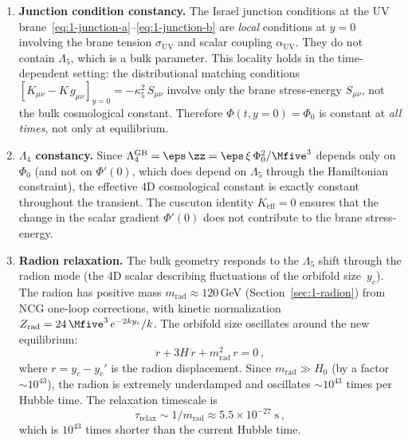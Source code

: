 \begin{enumerate}
\item \textbf{Junction condition constancy.} The Israel junction conditions at the UV brane~\eqref{eq:1-junction-a}--\eqref{eq:1-junction-b} are \emph{local} conditions at $y = 0$ involving the brane tension $\sigma_{\mathrm{UV}}$ and scalar coupling $\alpha_{\mathrm{UV}}$. They do not contain $\Lambda_5$, which is a bulk parameter. This locality holds in the time-dependent setting: the distributional matching conditions $[K_{\mu\nu} - K\, g_{\mu\nu}]_{y=0} = -\kappa_5^2\, S_{\mu\nu}$ involve only the brane stress-energy $S_{\mu\nu}$, not the bulk cosmological constant. Therefore $\Phi(t, y{=}0) = \Phi_0$ is constant at \emph{all times}, not only at equilibrium.

\item \textbf{$\Lambda_4$ constancy.} Since $\Lambda_4^{\mathrm{GB}} = \eps\,\zz = \eps\,\xi\,\Phi_0^2/\Mfive^3$ depends only on $\Phi_0$ (and not on $\Phi'(0)$, which does depend on $\Lambda_5$ through the Hamiltonian constraint), the effective 4D cosmological constant is exactly constant throughout the transient. The cuscuton identity $K_{\mathrm{eff}} = 0$ ensures that the change in the scalar gradient $\Phi'(0)$ does not contribute to the brane stress-energy.

\item \textbf{Radion relaxation.} The bulk geometry responds to the $\Lambda_5$ shift through the radion mode (the 4D scalar describing fluctuations of the orbifold size~$y_c$). The radion has positive mass $m_{\mathrm{rad}} \approx 120\,$GeV (Section~\ref{sec:1-radion}) from NCG one-loop corrections, with kinetic normalization $Z_{\mathrm{rad}} = 24\,\Mfive^3\,e^{-2ky_c}/k$. The orbifold size oscillates around the new equilibrium:
\begin{equation}
\ddot{r} + 3H\,\dot{r} + m_{\mathrm{rad}}^2\,r = 0\,,
\end{equation}
where $r = y_c - y_c'$ is the radion displacement. Since $m_{\mathrm{rad}} \gg H_0$ (by a factor $\sim 10^{43}$), the radion is extremely underdamped and oscillates $\sim 10^{43}$ times per Hubble time. The relaxation timescale is
\begin{equation}
\tau_{\mathrm{relax}} \sim 1/m_{\mathrm{rad}} \approx 5.5 \times 10^{-27}\;\mathrm{s}\,,
\end{equation}
which is $10^{43}$ times shorter than the current Hubble time.


\end{enumerate}
